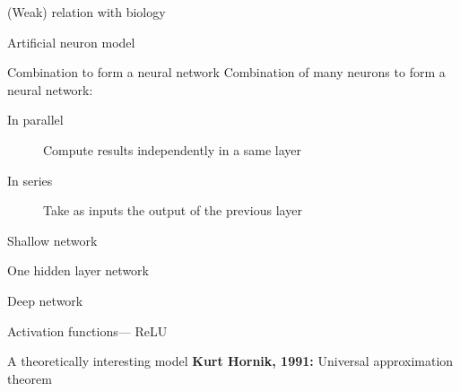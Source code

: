 \begin{frame}{(Weak) relation with biology}
\end{frame}

\begin{frame}{Artificial neuron model}
\end{frame}

\begin{frame}{Combination to form a neural network}
  Combination of many neurons to form a neural network:
  \begin{description}
    \item[In parallel] Compute results independently in a same layer
    \item[In series] Take as inputs the output of the previous layer
  \end{description}
\end{frame}

\begin{frame}{Shallow network}
  \centering
\end{frame}

\begin{frame}{One hidden layer network}
  \centering
\end{frame}

\begin{frame}{Deep network}
  \centering
\end{frame}

\begin{frame}{Activation functions--- ReLU}
  \begin{center}
  \end{center}

\end{frame}

\begin{frame}{A theoretically interesting model}
  \textbf{Kurt Hornik, 1991:} Universal approximation theorem

\end{frame}
